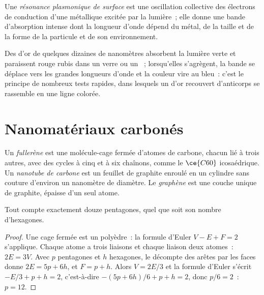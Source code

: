 \begin{definition}\label{def:b3:inorganic-materials:plasmon}
Une \emph{résonance plasmonique de surface} est une
oscillation collective des électrons de conduction d'une 
métallique excitée par la lumière~; elle donne une bande d'absorption
intense dont la longueur d'onde dépend du métal, de la taille et de la
forme de la particule et de son environnement.
\end{definition}

Des  d'or de quelques dizaines de nanomètres absorbent la
lumière verte et paraissent rouge rubis dans un verre ou un ~;
lorsqu'elles s'agrègent, la bande se déplace vers les grandes longueurs
d'onde et la couleur vire au bleu~: c'est le principe de nombreux tests
rapides, dans lesquels un  d'or recouvert d'anticorps se rassemble
en une ligne colorée.

\section{Nanomatériaux carbonés}

\begin{definition}\label{def:b3:inorganic-materials:carbon}
Un \emph{fullerène} est une molécule-cage fermée d'atomes de
carbone, chacun lié à trois autres, avec des cycles à cinq et à six
chaînons, comme le $\ce{C60}$ icosaédrique. Un \emph{nanotube de carbone} est un feuillet de
graphite enroulé en un cylindre sans couture d'environ un nanomètre de
diamètre. Le \emph{graphène} est une couche unique de graphite,
épaisse d'un seul atome.
\end{definition}

\begin{proposition}\label{prop:b3:inorganic-materials:euler}
Tout  compte exactement douze pentagones, quel que soit son nombre
d'hexagones.
\end{proposition}

\begin{proof}
Une cage fermée est un polyèdre~: la formule d'Euler $V - E + F = 2$ s'applique. Chaque atome a
trois liaisons et chaque liaison deux atomes~: $2E = 3V$. Avec $p$ pentagones et $h$ hexagones,
le décompte des arêtes par les faces donne $2E = 5p + 6h$, et $F = p + h$. Alors $V = 2E/3$ et la formule
d'Euler s'écrit $-E/3 + p + h = 2$, c'est-à-dire $-(5p + 6h)/6 + p + h = 2$, donc $p/6 = 2$~: $p = 12$.
\end{proof}

